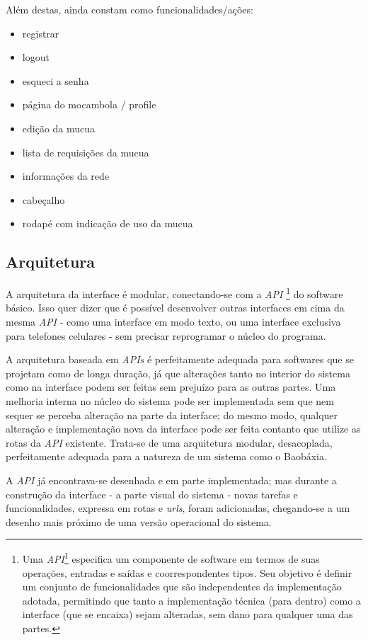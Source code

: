 Além destas, ainda constam como funcionalidades/ações:
\begin{itemize}
  \item registrar
  \item logout
  \item esqueci a senha
  \item página do mocambola / profile
  \item edição da mucua
  \item lista de requisições da mucua
  \item informações da rede
  \item cabeçalho
  \item rodapé com indicação de uso da mucua
\end{itemize}    

\subsection{Arquitetura}
A arquitetura da interface é modular, conectando-se com a \emph{API}
\footnote{Uma \emph{API}\footnote{Application programming interface}
  especifica um componente de software em termos de suas operações,
  entradas e saídas e coorrespondentes tipos. Seu objetivo é definir
  um conjunto de funcionalidades que são independentes da implementação
  adotada, permitindo que tanto a implementação técnica (para dentro)
  como a interface (que se encaixa) sejam alteradas, sem dano para
  qualquer uma das partes.} do software básico. Isso quer dizer que
é possível desenvolver outras interfaces em cima da mesma \emph{API}
- como uma interface em modo texto, ou uma interface exclusiva para
telefones celulares - sem precisar reprogramar o núcleo do programa.

A arquitetura baseada em \emph{APIs} é perfeitamente adequada para
softwares que se projetam como de longa duração, já que alterações
tanto no interior do sistema como na interface podem ser feitas sem
prejuízo para as outras partes. Uma melhoria interna no núcleo do sistema
pode ser implementada sem que nem sequer se perceba alteração na parte
da interface; do mesmo modo, qualquer alteração e implementação nova da
interface pode ser feita contanto que utilize as rotas da \emph{API}
existente. Trata-se de uma arquitetura modular, desacoplada,
perfeitamente adequada para a natureza de um sistema como o Baobáxia.

A \emph{API} já encontrava-se desenhada e em parte implementada; mas
durante a construção da interface - a parte visual do sistema - novas
tarefas e funcionalidades, expressa em rotas e \emph{urls}, foram
adicionadas, chegando-se a um desenho mais próximo de uma versão
operacional do sistema. 

